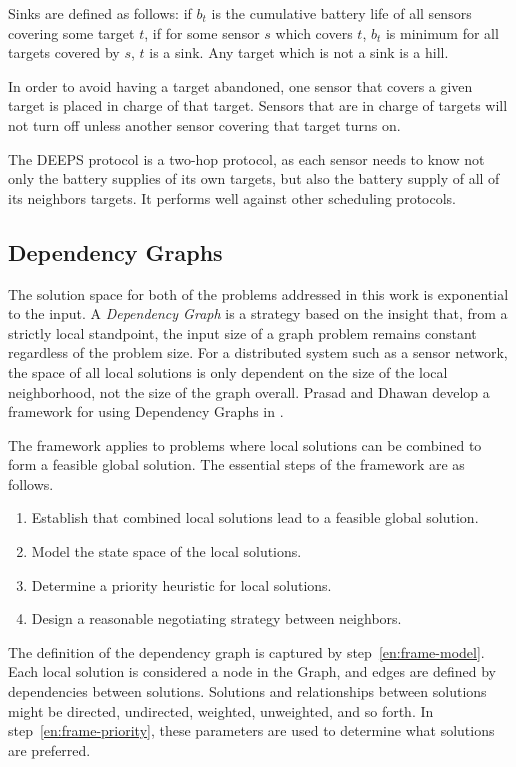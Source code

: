 \documentclass[conference, 10pt]{IEEEtran}
\begin{document}
Sinks are defined as follows: if $b_t$ is the cumulative battery life of all sensors covering some target $t$, if for some sensor $s$ which covers $t$, $b_t$ is minimum for all targets covered by $s$, $t$ is a sink. Any target which is not a sink is a hill.

In order to avoid having a target abandoned, one sensor that covers a given target is placed in charge of that target. Sensors that are in charge of targets will not turn off unless another sensor covering that target turns on. 

The DEEPS protocol is a two-hop protocol, as each sensor needs to know not only the battery supplies of its own targets, but also the battery supply of all of its neighbors targets. It performs well against other scheduling protocols. 

\subsection{Dependency Graphs}
\label{sec:dep-graphs}

 The solution space for both of the problems addressed in this work is exponential to the input. A {\em Dependency Graph} is a strategy based on the insight that, from a strictly local standpoint, the input size of a graph problem remains constant regardless of the problem size. For a distributed system such as a sensor network, the space of all local solutions is only dependent on the size of the local neighborhood, not the size of the graph overall\cite{978-3-540-77220-0_36}. Prasad and Dhawan develop a framework for using Dependency Graphs in \cite{IPDPS.2008.45361}.

The framework applies to problems where local solutions can be combined to form a feasible global solution. The essential steps of the framework are as follows. 
\begin{enumerate}
\item Establish that combined local solutions lead to a feasible global solution.
\item Model the state space of the local solutions. \label{en:frame-model}
\item Determine a priority heuristic for local solutions.\label{en:frame-priority}
\item Design a reasonable negotiating strategy between neighbors.
\end{enumerate} 

The definition of the dependency graph is captured by step~\ref{en:frame-model}. Each local solution is considered a node in the Graph, and edges are defined by dependencies between solutions. Solutions and relationships between solutions might be directed, undirected, weighted, unweighted, and so forth. In step~\ref{en:frame-priority}, these parameters are used to determine what solutions are preferred. 
\end{document}

